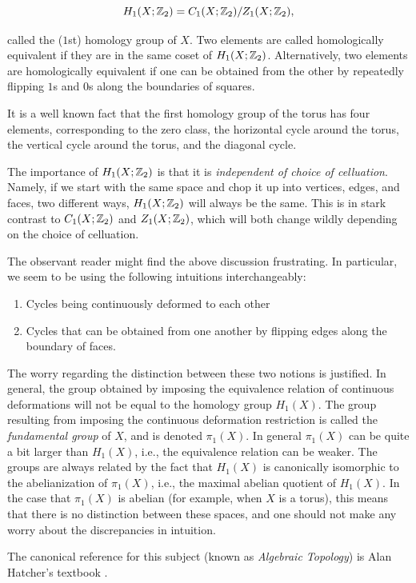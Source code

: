\documentclass{article}
\theoremstyle{definition}
\numberwithin{figure}{section}
\begin{document}
$$H_1(X;\mathbb{Z}_2)=C_1(X;\mathbb{Z}_2)/Z_1(X;\mathbb{Z}_2),$$

called the ($1$st) homology group of $X$. Two elements are called homologically equivalent if they are in the same coset of $H_1(X;\mathbb{Z}_2)$. Alternatively, two elements are homologically equivalent if one can be obtained from the other by repeatedly flipping $1$s and $0$s along the boundaries of squares.

It is a well known fact that the first homology group of the torus has four elements, corresponding to the zero class, the horizontal cycle around the torus, the vertical cycle around the torus, and the diagonal cycle.

The importance of $H_1(X;\mathbb{Z}_2)$ is that it is \textit{independent of choice of celluation}. Namely, if we start with the same space and chop it up into vertices, edges, and faces, two different ways, $H_1(X;\mathbb{Z}_2)$ will always be the same. This is in stark contrast to $C_1(X;\mathbb{Z}_2)$ and $Z_1(X;\mathbb{Z}_2)$, which will both change wildly depending on the choice of celluation.

The observant reader might find the above discussion frustrating. In particular, we seem to be using the following intuitions interchangeably:

\begin{enumerate}
\item Cycles being continuously deformed to each other
\item Cycles that can be obtained from one another by flipping edges along the boundary of faces.
\end{enumerate}

The worry regarding the distinction between these two notions is justified. In general, the group obtained by imposing the equivalence relation of continuous deformations will not be equal to the homology group $H_1(X)$. The group resulting from imposing the continuous deformation restriction is called the \textit{fundamental group} of $X$, and is denoted $\pi_1(X)$. In general $\pi_1(X)$ can be quite a bit larger than $H_1(X)$, i.e., the equivalence relation can be weaker. The groups are always related by the fact that $H_1(X)$ is canonically isomorphic to the abelianization of $\pi_1(X)$, i.e., the maximal abelian quotient of $H_1(X)$. In the case that $\pi_1(X)$ is abelian (for example, when $X$ is a torus), this means that there is no distinction between these spaces, and one should not make any worry about the discrepancies in intuition.

The canonical reference for this subject (known as \textit{Algebraic Topology}) is Alan Hatcher's textbook \cite{hatcher2005algebraic}.
\end{document}

